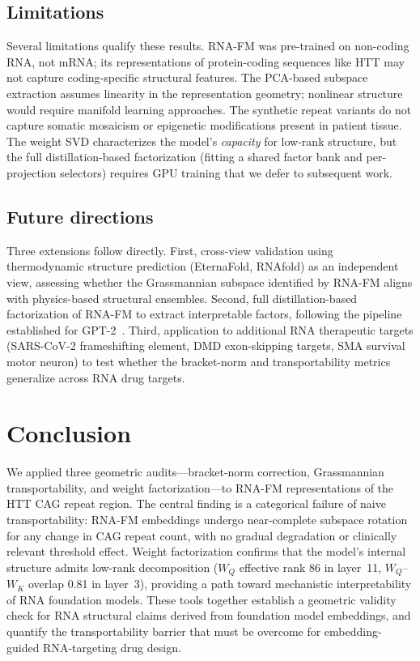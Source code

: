 \documentclass[11pt]{article}
\begin{document}
\subsection{Limitations}

Several limitations qualify these results. RNA-FM was pre-trained
on non-coding RNA, not mRNA; its representations of protein-coding
sequences like HTT may not capture coding-specific structural features.
The PCA-based subspace extraction assumes linearity in the
representation geometry; nonlinear structure would require manifold
learning approaches. The synthetic repeat variants do not capture
somatic mosaicism or epigenetic modifications present in patient
tissue. The weight SVD characterizes the model's \emph{capacity}
for low-rank structure, but the full distillation-based factorization
(fitting a shared factor bank and per-projection selectors) requires
GPU training that we defer to subsequent work.

\subsection{Future directions}

Three extensions follow directly. First, cross-view validation using
thermodynamic structure prediction (EternaFold, RNAfold) as an
independent view, assessing whether the Grassmannian subspace identified
by RNA-FM aligns with physics-based structural ensembles. Second, full
distillation-based factorization of RNA-FM to extract interpretable
factors, following the pipeline established for
GPT-2~\citep{tower2026fac}. Third, application
to additional RNA therapeutic targets (SARS-CoV-2 frameshifting element,
DMD exon-skipping targets, SMA survival motor neuron) to test whether
the bracket-norm and transportability metrics generalize across RNA
drug targets.


\section{Conclusion}
\label{sec:conclusion}

We applied three geometric audits---bracket-norm correction,
Grassmannian transportability, and weight factorization---to RNA-FM
representations of the HTT CAG repeat region.
The central finding is a categorical failure of naive transportability:
RNA-FM embeddings undergo near-complete subspace rotation for any
change in CAG repeat count, with no gradual degradation or clinically
relevant threshold effect. Weight factorization confirms that the
model's internal structure admits low-rank decomposition ($W_Q$
effective rank 86 in layer~11, $W_Q$--$W_K$ overlap 0.81 in
layer~3), providing a path toward mechanistic interpretability of
RNA foundation models. These tools together establish a geometric
validity check for RNA structural claims derived from foundation
model embeddings, and quantify the transportability barrier that must
be overcome for embedding-guided RNA-targeting drug design.
\end{document}
